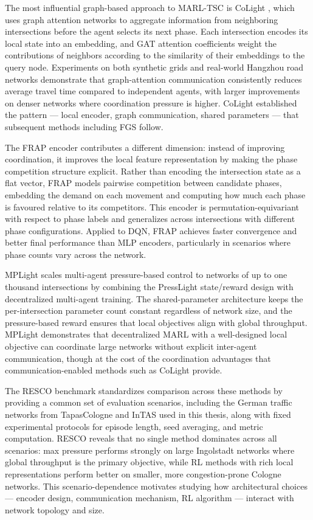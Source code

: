 The most influential graph-based approach to MARL-TSC is CoLight \citep{wei2019colight}, which uses graph attention networks to aggregate information from neighboring intersections before the agent selects its next phase. Each intersection encodes its local state into an embedding, and GAT attention coefficients \citep{velickovic2018graph} weight the contributions of neighbors according to the similarity of their embeddings to the query node. Experiments on both synthetic grids and real-world Hangzhou road networks demonstrate that graph-attention communication consistently reduces average travel time compared to independent agents, with larger improvements on denser networks where coordination pressure is higher. CoLight established the pattern — local encoder, graph communication, shared parameters — that subsequent methods including FGS follow.

The FRAP encoder \citep{zheng2019learning} contributes a different dimension: instead of improving coordination, it improves the local feature representation by making the phase competition structure explicit. Rather than encoding the intersection state as a flat vector, FRAP models pairwise competition between candidate phases, embedding the demand on each movement and computing how much each phase is favoured relative to its competitors. This encoder is permutation-equivariant with respect to phase labels and generalizes across intersections with different phase configurations. Applied to DQN, FRAP achieves faster convergence and better final performance than MLP encoders, particularly in scenarios where phase counts vary across the network.

MPLight \citep{chen2020toward} scales multi-agent pressure-based control to networks of up to one thousand intersections by combining the PressLight state/reward design with decentralized multi-agent training. The shared-parameter architecture keeps the per-intersection parameter count constant regardless of network size, and the pressure-based reward ensures that local objectives align with global throughput. MPLight demonstrates that decentralized MARL with a well-designed local objective can coordinate large networks without explicit inter-agent communication, though at the cost of the coordination advantages that communication-enabled methods such as CoLight provide.

The RESCO benchmark \citep{ault2021reinforcement} standardizes comparison across these methods by providing a common set of evaluation scenarios, including the German traffic networks from TapasCologne \citep{tapascologne} and InTAS \citep{intasscenario} used in this thesis, along with fixed experimental protocols for episode length, seed averaging, and metric computation. RESCO reveals that no single method dominates across all scenarios: max pressure performs strongly on large Ingolstadt networks where global throughput is the primary objective, while RL methods with rich local representations perform better on smaller, more congestion-prone Cologne networks. This scenario-dependence motivates studying how architectural choices — encoder design, communication mechanism, RL algorithm — interact with network topology and size.

